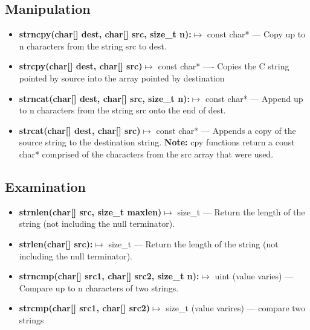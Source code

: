 \documentclass{report}
\begin{document}
    \subsection{Manipulation}
    \begin{itemize}
        \item \textbf{strncpy(char[] dest, char[] src, size\_t n):}$\mapsto$ const char* --- Copy up to n characters from the string src to dest.
        \item \textbf{strcpy(char[] dest, char[] src)}$\mapsto$ const char* ---- Copies the C string pointed by source into the array pointed by destination
        \item \textbf{strncat(char[] dest, char[] src, size\_t n):}$\mapsto$ const char* --- Append up to n characters from the string src onto the end of dest.
        \item \textbf{strcat(char[] dest, char[] src)}$\mapsto$ const char* --- Appends a copy of the source string to the destination string.
        \bigbreak \noindent 
        \textbf{Note:} cpy functions return a const char* comprised of the characters from the src array that were used.
    \end{itemize}

    \bigbreak \noindent 
    \subsection{Examination}
    \begin{itemize}
        \item \textbf{strnlen(char[] src, size\_t maxlen)}$\mapsto$ size\_t --- Return the length of the string (not including the null terminator).
        \item \textbf{strlen(char[] src):}$\mapsto$ size\_t --- Return the length of the string (not including the null terminator).
        \item \textbf{strncmp(char[] src1, char[] src2, size\_t n):}$\mapsto$ uint (value varies) --- Compare up to n characters of two strings.
        \item \textbf{strcmp(char[] src1, char[] src2)}$\mapsto$ size\_t (value varires) --- compare two strings
    \end{itemize}

    \bigbreak \noindent 
\end{document}
